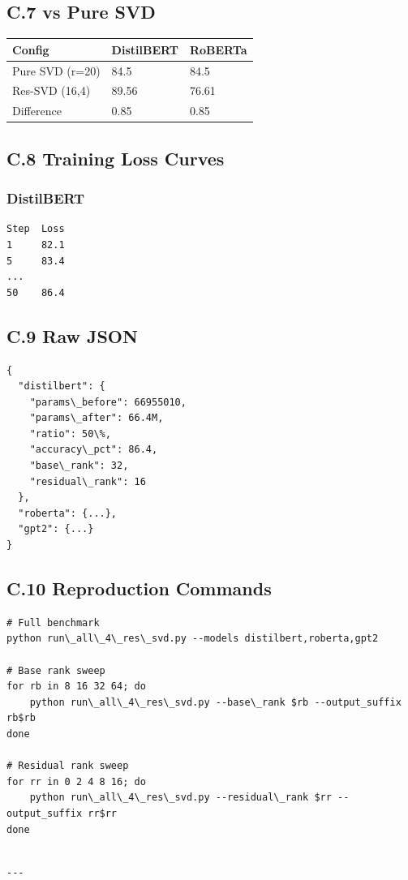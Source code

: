 \subsection{C.7 vs Pure SVD}

\begin{table}[H]
\centering
\small
\begin{tabular}{lll}
\toprule
\textbf{Config} & \textbf{DistilBERT} & \textbf{RoBERTa} \\
\midrule
Pure SVD (r=20) & 84.5 & 84.5 \\
Res-SVD (16,4) & 89.56 & 76.61 \\
Difference & 0.85 & 0.85 \\
\bottomrule
\end{tabular}
\end{table}

\subsection{C.8 Training Loss Curves}

\subsubsection{DistilBERT}
\begin{lstlisting}
Step  Loss
1     82.1
5     83.4
...
50    86.4
\end{lstlisting}

\subsection{C.9 Raw JSON}

\begin{lstlisting}
{
  "distilbert": {
    "params\_before": 66955010,
    "params\_after": 66.4M,
    "ratio": 50\%,
    "accuracy\_pct": 86.4,
    "base\_rank": 32,
    "residual\_rank": 16
  },
  "roberta": {...},
  "gpt2": {...}
}
\end{lstlisting}

\subsection{C.10 Reproduction Commands}

\begin{lstlisting}
# Full benchmark
python run\_all\_4\_res\_svd.py --models distilbert,roberta,gpt2

# Base rank sweep
for rb in 8 16 32 64; do
    python run\_all\_4\_res\_svd.py --base\_rank $rb --output_suffix rb$rb
done

# Residual rank sweep
for rr in 0 2 4 8 16; do
    python run\_all\_4\_res\_svd.py --residual\_rank $rr --output_suffix rr$rr
done
\end{lstlisting}
\begin{lstlisting}

---
\end{lstlisting}